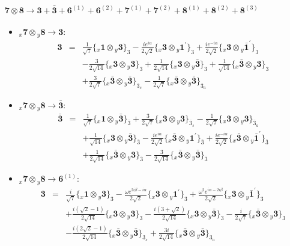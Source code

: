\documentclass[english]{article}
\newcommand{\rep}[1]{\mathbf{#1}}
\newcommand{\repx}[2]{{}_{#2}\mathbf{#1}}
\newcommand{\subcg}[3]{\big\{ \repx{#1}{x}\otimes\repx{#2}{y}\big\}^{}_{#3}}
\begin{document}
\paragraph*{\Large $\rep{7}\otimes\rep{8}\to\rep{3}+\rep{\bar{3}}+\rep{6}^{(1)}+\rep{6}^{(2)}+\rep{7}^{(1)}+\rep{7}^{(2)}+\rep{8}^{(1)}+\rep{8}^{(2)}+\rep{8}^{(3)}$}
\begin{itemize}
\item $\repx{7}{x}\otimes\repx{8}{y}\to\rep{3}$:
\begin{eqnarray*}
\rep{3} &=& \frac{1}{\sqrt{7}}\subcg{1}{3}{3}-\frac{i e^{i \alpha }}{2 \sqrt{2}}\subcg{3}{1^{\prime}}{3}+\frac{i e^{-i \alpha }}{2 \sqrt{2}}\subcg{3}{\bar{1}^{\prime}}{3} \\ 
 & & -\frac{3}{2 \sqrt{14}}\subcg{3}{3}{3}+\frac{1}{2 \sqrt{14}}\subcg{3}{\bar{3}}{3}+\frac{1}{\sqrt{14}}\subcg{\bar{3}}{3}{3} \\ 
 & & +\frac{3}{2 \sqrt{7}}\subcg{\bar{3}}{\bar{3}}{3_{s}}-\frac{1}{2 \sqrt{7}}\subcg{\bar{3}}{\bar{3}}{3_{a}}
\end{eqnarray*}
\item $\repx{7}{x}\otimes\repx{8}{y}\to\rep{\bar{3}}$:
\begin{eqnarray*}
\rep{\bar{3}} &=& \frac{1}{\sqrt{7}}\subcg{1}{\bar{3}}{\bar{3}}+\frac{3}{2 \sqrt{7}}\subcg{3}{3}{\bar{3}_{s}}-\frac{1}{2 \sqrt{7}}\subcg{3}{3}{\bar{3}_{a}} \\ 
 & & +\frac{1}{\sqrt{14}}\subcg{3}{\bar{3}}{\bar{3}}-\frac{i e^{i \alpha }}{2 \sqrt{2}}\subcg{\bar{3}}{1^{\prime}}{\bar{3}}+\frac{i e^{-i \alpha }}{2 \sqrt{2}}\subcg{\bar{3}}{\bar{1}^{\prime}}{\bar{3}} \\ 
 & & +\frac{1}{2 \sqrt{14}}\subcg{\bar{3}}{3}{\bar{3}}-\frac{3}{2 \sqrt{14}}\subcg{\bar{3}}{\bar{3}}{\bar{3}}
\end{eqnarray*}
\item $\repx{7}{x}\otimes\repx{8}{y}\to\rep{6}^{(1)}$:
\begin{eqnarray*}
\rep{3} &=& \frac{i}{\sqrt{7}}\subcg{1}{3}{3}-\frac{\omega  e^{2 i \beta -i \alpha }}{2 \sqrt{2}}\subcg{3}{1^{\prime}}{3}+\frac{\omega ^2 e^{i \alpha -2 i \beta }}{2 \sqrt{2}}\subcg{3}{\bar{1}^{\prime}}{3} \\ 
 & & +\frac{i \left(\sqrt{2}-1\right)}{2 \sqrt{14}}\subcg{3}{3}{3}-\frac{i \left(3+\sqrt{2}\right)}{2 \sqrt{14}}\subcg{3}{\bar{3}}{3}-\frac{i}{2 \sqrt{7}}\subcg{\bar{3}}{3}{3} \\ 
 & & -\frac{i \left(2 \sqrt{2}-1\right)}{2 \sqrt{14}}\subcg{\bar{3}}{\bar{3}}{3_{s}}+\frac{3 i}{2 \sqrt{14}}\subcg{\bar{3}}{\bar{3}}{3_{a}}

\end{eqnarray*}
\end{itemize}
\end{document}
